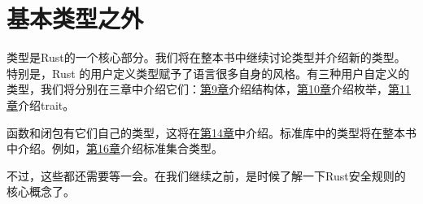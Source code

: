 \section{基本类型之外}

类型是Rust的一个核心部分。我们将在整本书中继续讨论类型并介绍新的类型。特别是，Rust 的用户定义类型赋予了语言很多自身的风格。有三种用户自定义的类型，我们将分别在三章中介绍它们：\hyperref[ch09]{第9章}介绍结构体，\hyperref[ch10]{第10章}介绍枚举，\hyperref[ch11]{第11章}介绍trait。

函数和闭包有它们自己的类型，这将在\hyperref[ch14]{第14章}中介绍。标准库中的类型将在整本书中介绍。例如，\hyperref[ch16]{第16章}介绍标准集合类型。

不过，这些都还需要等一会。在我们继续之前，是时候了解一下Rust安全规则的核心概念了。
